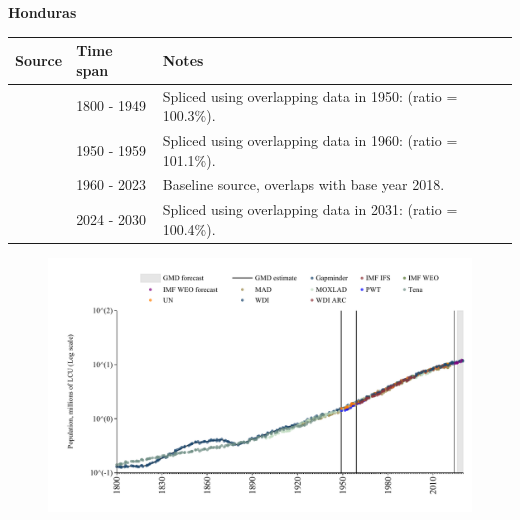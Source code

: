 \documentclass[12pt,a4paper,landscape]{article}
\begin{document}
\begin{adjustbox}{max totalsize={\paperwidth}{\paperheight},center}
\begin{minipage}[t][\textheight][t]{\textwidth}
\vspace*{0.5cm}
{}
\begin{center}
{\Large\bfseries Honduras}
\end{center}
\vspace{0.5cm}
\begin{table}[H]
\centering
\small
\begin{tabular}{|l|l|l|}
\hline
\textbf{Source} & \textbf{Time span} & \textbf{Notes} \\
\hline
\rowcolor{white}\cite{Gapminder}& 1800 - 1949 &Spliced using overlapping data in 1950: (ratio = 100.3\%).\\
\rowcolor{lightgray}\cite{IMF_IFS}& 1950 - 1959 &Spliced using overlapping data in 1960: (ratio = 101.1\%).\\
\rowcolor{white}\cite{WDI}& 1960 - 2023 &Baseline source, overlaps with base year 2018.\\
\rowcolor{lightgray}\cite{Gapminder}& 2024 - 2030 &Spliced using overlapping data in 2031: (ratio = 100.4\%).\\
\hline
\end{tabular}
\end{table}
\begin{figure}[H]
\centering
\includegraphics[width=\textwidth,height=0.6\textheight,keepaspectratio]{graphs/HND_pop.pdf}
\end{figure}
\end{minipage}
\end{adjustbox}
\end{document}
